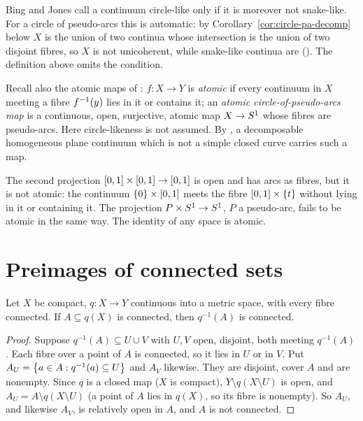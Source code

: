 \begin{remark}\label{rem:nonsnake}
Bing and Jones call a continuum circle-like only if it is moreover not snake-like. For a circle of pseudo-arcs this is automatic: by
Corollary~\ref{cor:circle-pa-decomp} below $X$ is the union of two continua whose intersection is the union of two disjoint fibres, so $X$ is not
unicoherent, while snake-like continua are (). The definition above omits the condition.
\end{remark}

Recall also the atomic maps of : $f\colon X\to Y$ is \emph{atomic} if every continuum in $X$ meeting a fibre $f^{-1}(y)$ lies in it or
contains it; an \emph{atomic circle-of-pseudo-arcs map} is a continuous, open, surjective, atomic map $X\to S^1$ whose fibres are pseudo-arcs. Here
circle-likeness is not assumed. By , a decomposable homogeneous plane continuum which is not a simple closed curve carries such a map.

\begin{example}\label{ex:not-atomic}
The second projection $[0,1]\times[0,1]\to[0,1]$ is open and has arcs as fibres, but it is not atomic: the continuum $\left\{ 0 \right\}\times[0,1]$ meets the fibre $[0,1]\times\left\{ t \right\}$
without lying in it or containing it. The projection $P\times S^1\to S^1$, $P$ a pseudo-arc, fails to be atomic in the same way. The identity of any
space is atomic.
\end{example}


\section{Preimages of connected sets}

\begin{lemma}\label{lem:monotone-preimage}
Let $X$ be compact, $q\colon X\to Y$ continuous into a metric space, with every fibre connected. If $A\subseteq q(X)$ is connected, then $q^{-1}(A)$ is
connected.
\end{lemma}

\begin{proof}
Suppose $q^{-1}(A)\subseteq U\cup V$ with $U,V$ open, disjoint, both meeting $q^{-1}(A)$. Each fibre over a point of $A$ is connected, so it lies in $U$ or
in $V$. Put $A_U=\left\{ a\in A:q^{-1}(a)\subseteq U \right\}$ and $A_V$ likewise. They are disjoint, cover $A$ and are nonempty. Since $q$ is a closed map ($X$ is
compact), $Y\setminus q(X\setminus U)$ is open, and $A_U=A\setminus q(X\setminus U)$ (a point of $A$ lies in $q(X)$, so its fibre is nonempty).
So $A_U$, and likewise $A_V$, is relatively open in $A$, and $A$ is not connected.
\end{proof}

